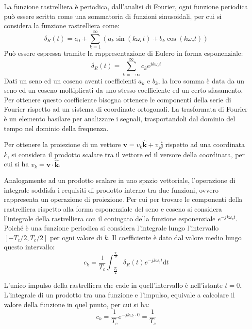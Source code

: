 \documentclass{article}
\numberwithin{equation}{subsection}
\newcommand{\df}{\mathrm{d}}
\begin{document}
La funzione rastrelliera è periodica, dall'analisi di Fourier, ogni funzione periodica può essere scritta come una sommatoria di funzioni sinusoidali, per 
cui si considera la funzione rastrelliera come:
\begin{equation*}
    \delta_R(t)=c_0+\sum_{k=1}^{\infty}\left(a_k\sin(k\omega_ct)+b_k\cos(k\omega_ct)\right)
\end{equation*}
Può essere espressa tramite la rappresentazione di Eulero in forma esponenziale:
\begin{equation*}
    \delta_R(t)=\sum_{k=-\infty}^{\infty}c_ke^{jk\omega_ct}
\end{equation*}
Dati un seno ed un coseno aventi coefficienti $a_k$ e $b_k$, la loro somma è data da un seno ed un coseno moltiplicati da uno stesso coefficiente ed un certo sfasamento. 
Per ottenere questo coefficiente bisogna ottenere le componenti della serie di Fourier rispetto ad un sistema di coordinate ortogonali. La trasformata di Fourier è un elemento basilare per analizzare 
i segnali, trasportandoli dal dominio del tempo nel dominio della frequenza. 

Per ottenere la 
proiezione di un vettore $\mathbf{v}=v_k\hat{\mathbf{k}}+v_j\hat{\mathbf{j}}$ rispetto ad una coordinata $k$, si considera il prodotto scalare tra il vettore ed il versore della coordinata, 
per cui si ha $v_k=\mathbf{v}\cdot\hat{\mathbf{k}}$. 

Analogamente ad un prodotto scalare in uno spazio vettoriale, l'operazione di integrale soddisfa i requisiti di prodotto interno tra due funzioni, ovvero rappresenta un 
operazione di proiezione. Per cui per trovare le componenti della rastrelliera rispetto alla forma esponenziale del seno e coseno si considera l'integrale della 
rastrelliera con il coniugato della funzione esponenziale $e^{-jk\omega_ct}$. Poiché è una funzione periodica si 
considera l'integrale lungo l'intervallo $\left[-T_c/2,T_c/2\right]$ per ogni valore di $k$. 
Il coefficiente è dato dal valore medio lungo questo intervallo: 
\begin{equation*}
    c_k=\displaystyle\frac{1}{T_c}\int_{-\frac{T_c}{2}}^{\frac{T_c}{2}}\delta_R(t)e^{-jk\omega_ct}\df t
\end{equation*}

L'unico impulso della rastrelliera che cade in quell'intervallo è nell'istante $t=0$. L'integrale di un prodotto tra una funzione e l'impulso, equivale a calcolare il valore 
della funzione in quel punto, per cui si ha:
\begin{equation*}
    c_k=\displaystyle\frac{1}{T_c}e^{-jk\omega_c \cdot0}=\frac{1}{T_c}
\end{equation*}
\end{document}
